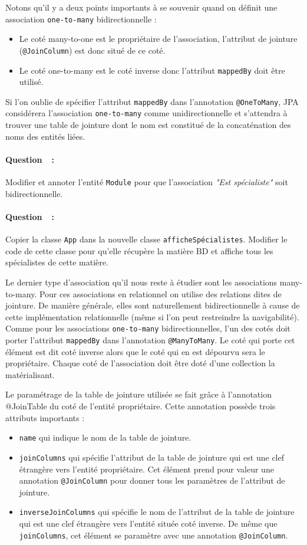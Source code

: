 \documentclass[a4paper,11pt]{article}
\newcounter{compteurQuestion}
\newcommand{\Question}{\paragraph*{Question~\thecompteurQuestion~:}\addtocounter{compteurQuestion}{1}}
\begin{document}
Notons qu'il y a deux points importants à se souvenir quand on définit une association \texttt{one-to-many} 
bidirectionnelle : 
\begin{itemize}
  \item Le coté many-to-one est le propriétaire de l'association, l'attribut de jointure (\texttt{@JoinColumn}) 
  est donc situé de ce coté.
  \item Le coté one-to-many est le coté inverse donc l'attribut \texttt{mappedBy} doit être utilisé. 
\end{itemize}
Si l'on oublie de spécifier l'attribut \texttt{mappedBy} dans l'annotation \texttt{@OneToMany}, JPA considérera 
l'association \texttt{one-to-many} comme unidirectionnelle et s'attendra à trouver une table de jointure dont le nom est 
constitué de la concaténation des noms des entités liées.

\Question Modifier et annoter l'entité \texttt{Module} pour que l'association \textit{"Est spécialiste"} soit bidirectionnelle.
\Question  Copier la classe \texttt{App} dans la nouvelle classe \texttt{afficheSpécialistes}. Modifier le code de cette classe 
pour qu'elle récupère la matière BD et affiche tous les spécialistes de cette matière.

Le dernier type d'association qu'il nous reste à étudier sont les associations many-to-many. Pour ces associations en 
relationnel on utilise des relations dites de jointure. De manière générale, elles sont naturellement bidirectionnelle 
à cause de cette implémentation relationnelle (même si l'on peut restreindre la navigabilité). Comme pour les associations 
\texttt{one-to-many} bidirectionnelles, l'un des cotés doit porter l'attribut \texttt{mappedBy} dans l'annotation 
\texttt{@ManyToMany}. Le coté qui porte cet élément est dit coté inverse alors que le coté qui en est dépourvu sera le 
propriétaire. Chaque coté de l'association doit être doté d'une collection la matérialisant.

Le paramétrage de la table de jointure utilisée se fait grâce à l'annotation @JoinTable du coté de l'entité propriétaire. 
Cette annotation possède trois attributs importants :
\begin{itemize}
  \item \texttt{name} qui indique le nom de la table de jointure.
  \item \texttt{joinColumns} qui spécifie l'attribut de la table de jointure qui est une clef étrangère vers 
  l'entité propriétaire. Cet élément prend pour valeur une annotation \texttt{@JoinColumn} pour donner tous les 
  paramètres de l'attribut de jointure.
  \item \texttt{inverseJoinColumns} qui spécifie le nom de l'attribut de la table de jointure qui est une clef étrangère vers 
  l'entité située coté inverse. De même que \texttt{joinColumns}, cet élément se paramètre avec une annotation \texttt{@JoinColumn}.
\end{itemize}
\end{document}
